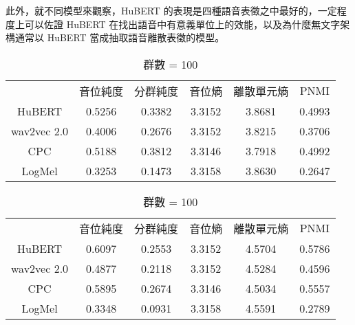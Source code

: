此外，就不同模型來觀察，HuBERT 的表現是四種語音表徵之中最好的，一定程度上可以佐證 HuBERT 在找出語音中有意義單位上的效能，以及為什麼無文字架構通常以 HuBERT 當成抽取語音離散表徵的模型。


\begin{table}[!htbp]
    \centering
    \begin{subtable}[t]{\textwidth}
        \centering
        \begin{tabular}{cccccc}
            & 音位純度 & 分群純度 & 音位熵 & 離散單元熵 & PNMI \\
            HuBERT      &   0.5256   &  0.3382 &   3.3152  &  3.8681    &     0.4993   \\   %
            wav2vec 2.0 &   0.4006   &  0.2676 &   3.3152  &  3.8215    &     0.3706   \\   %
            CPC         &   0.5188   &  0.3812 &   3.3146  &  3.7918    &     0.4992   \\   %
            LogMel      &   0.3253   &  0.1473 &   3.3158  &  3.8630    &     0.2647   \\   %
        \end{tabular}
        \caption{群數 = 50}
        \label{tab:ch3-clu050}
    \end{subtable}

    \vspace{0.5cm}

    \begin{subtable}[t]{\textwidth}
        \centering
        \begin{tabular}{cccccc}
            & 音位純度 & 分群純度 & 音位熵 & 離散單元熵 & PNMI \\
            HuBERT      &   0.6097   &  0.2553 &   3.3152  &  4.5704    &     0.5786   \\   %
            wav2vec 2.0 &   0.4877   &  0.2118 &   3.3152  &  4.5284    &     0.4596   \\   %
            CPC         &   0.5895   &  0.2674 &   3.3146  &  4.5034    &     0.5557   \\   %
            LogMel      &   0.3348   &  0.0931 &   3.3158  &  4.5591    &     0.2789   \\   %
        \end{tabular}
        \caption{群數 = 100}
        \label{tab:ch3-clu100}
    \end{subtable}

    \vspace{0.5cm}


\end{table}
